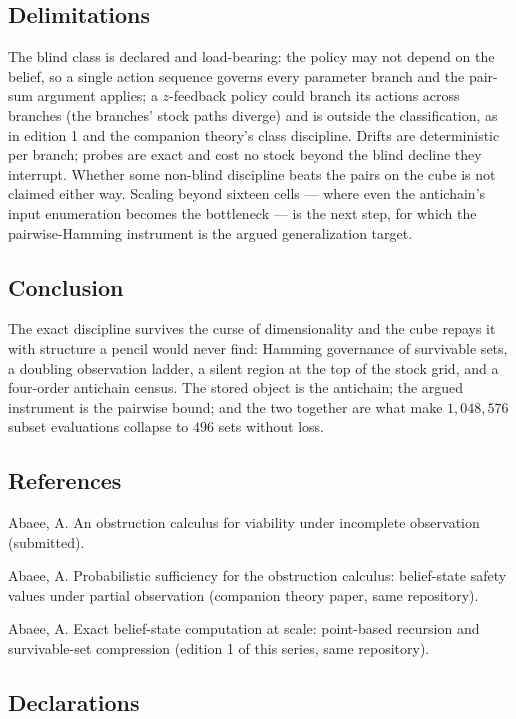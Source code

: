 \documentclass[10pt,twocolumn]{article}
\theoremstyle{plain}
\theoremstyle{definition}
\theoremstyle{remark}
\begin{document}
\subsection{Delimitations}\label{scope}

The blind class is declared and load-bearing: the policy may not
depend on the belief, so a single action sequence governs every
parameter branch and the pair-sum argument applies; a
\(z\)-feedback policy could branch its actions across branches (the
branches' stock paths diverge) and is outside the classification, as
in edition 1 and the companion theory's class discipline. Drifts are
deterministic per branch; probes are exact and cost no stock beyond
the blind decline they interrupt. Whether some non-blind discipline
beats the pairs on the cube is not claimed either way. Scaling beyond
sixteen cells --- where even the antichain's input enumeration becomes
the bottleneck --- is the next step, for which the pairwise-Hamming
instrument is the argued generalization target.

\subsection{Conclusion}\label{conclusion}

The exact discipline survives the curse of dimensionality and the
cube repays it with structure a pencil would never find: Hamming
governance of survivable sets, a doubling observation ladder, a
silent region at the top of the stock grid, and a four-order
antichain census. The stored object is the antichain; the argued
instrument is the pairwise bound; and the two together are what make
\(1{,}048{,}576\) subset evaluations collapse to \(496\) sets without
loss.

\subsection*{References}

{\footnotesize
Abaee, A. An obstruction calculus for viability under incomplete
observation (submitted).

Abaee, A. Probabilistic sufficiency for the obstruction calculus:
belief-state safety values under partial observation (companion
theory paper, same repository).

Abaee, A. Exact belief-state computation at scale: point-based
recursion and survivable-set compression (edition 1 of this series,
same repository).
}

\subsection*{Declarations}
\end{document}
